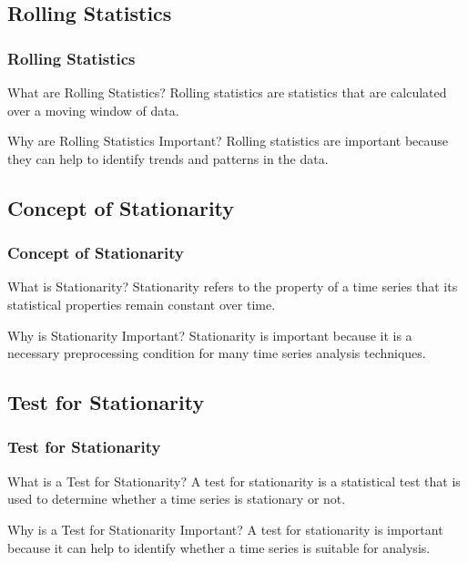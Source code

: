 \documentclass[aspectratio=169, hideothersubsections]{beamer}
\begin{document}
\subsection{Rolling Statistics}

\begin{frame}
  \frametitle{Rolling Statistics}
  \begin{block}{What are Rolling Statistics?}
    Rolling statistics are statistics that are calculated over a moving window of data.
  \end{block}
  \begin{block}{Why are Rolling Statistics Important?}
    Rolling statistics are important because they can help to identify trends and patterns in the data.
  \end{block}
\end{frame}

\subsection{Concept of Stationarity}

\begin{frame}
  \frametitle{Concept of Stationarity}
  \begin{block}{What is Stationarity?}
    Stationarity refers to the property of a time series that its statistical properties remain constant over time.
  \end{block}
  \begin{block}{Why is Stationarity Important?}
    Stationarity is important because it is a necessary preprocessing condition for many time series analysis techniques.
  \end{block}
\end{frame}

\subsection{Test for Stationarity}

\begin{frame}
  \frametitle{Test for Stationarity}
  \begin{block}{What is a Test for Stationarity?}
    A test for stationarity is a statistical test that is used to determine whether a time series is stationary or not.
  \end{block}
  \begin{block}{Why is a Test for Stationarity Important?}
    A test for stationarity is important because it can help to identify whether a time series is suitable for analysis.
  \end{block}
\end{frame}
\end{document}
